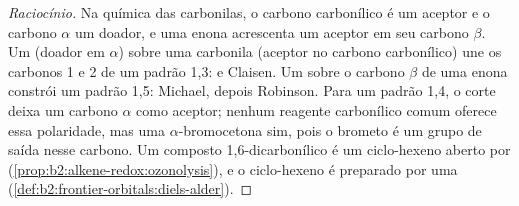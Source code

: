\begin{proof}[Raciocínio]
Na química das carbonilas, o carbono carbonílico é um aceptor e o carbono $\alpha$ um doador, e uma
enona acrescenta um aceptor em seu carbono $\beta$. Um  (doador em $\alpha$) sobre uma carbonila
(aceptor no carbono carbonílico) une os carbonos 1 e 2 de um padrão 1,3:  e Claisen. Um 
sobre o carbono $\beta$ de uma enona constrói um padrão 1,5: Michael, depois Robinson. Para um padrão
1,4, o corte deixa um carbono $\alpha$ como aceptor; nenhum reagente carbonílico comum oferece essa
polaridade, mas uma $\alpha$-bromocetona sim, pois o brometo é um grupo de saída nesse carbono. Um
composto 1,6-dicarbonílico é um ciclo-hexeno aberto por  (\cref{prop:b2:alkene-redox:ozonolysis}),
e o ciclo-hexeno é preparado por uma 
(\cref{def:b2:frontier-orbitals:diels-alder}).
\end{proof}

